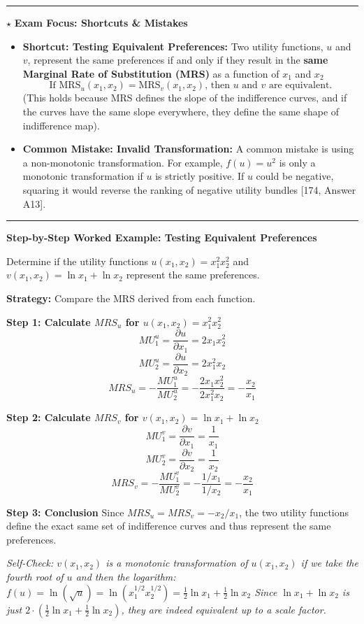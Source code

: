 \documentclass{article}
\begin{document}
\noindent\rule{\linewidth}{0.4pt}

\noindent $\star$ \textbf{Exam Focus: Shortcuts \& Mistakes}

\begin{itemize}
    \item \textbf{Shortcut: Testing Equivalent Preferences:} Two utility functions, $u$ and $v$, represent the same preferences if and only if they result in the \textbf{same Marginal Rate of Substitution (MRS)} as a function of $x_1$ and $x_2$ \[\text{If } \text{MRS}_u(x_1, x_2) = \text{MRS}_v(x_1, x_2) \text{, then } u \text{ and } v \text{ are equivalent.}\] (This holds because MRS defines the slope of the indifference curves, and if the curves have the same slope everywhere, they define the same shape of indifference map).
    \item \textbf{Common Mistake: Invalid Transformation:} A common mistake is using a non-monotonic transformation. For example, $f(u)=u^2$ is only a monotonic transformation if $u$ is strictly positive. If $u$ could be negative, squaring it would reverse the ranking of negative utility bundles [174, Answer A13].
\end{itemize}

\noindent\rule{\linewidth}{0.4pt}

\noindent\textbf{Step-by-Step Worked Example: Testing Equivalent Preferences}

Determine if the utility functions $u(x_1, x_2) = x_1^2 x_2^2$ and $v(x_1, x_2) = \ln x_1 + \ln x_2$ represent the same preferences.

\textbf{Strategy:} Compare the MRS derived from each function.

\textbf{Step 1: Calculate $MRS_u$ for $u(x_1, x_2) = x_1^2 x_2^2$} \[MU_1^u = \frac{\partial u}{\partial x_1} = 2x_1 x_2^2\] \[MU_2^u = \frac{\partial u}{\partial x_2} = 2x_1^2 x_2\] \[MRS_u = -\frac{MU_1^u}{MU_2^u} = -\frac{2x_1 x_2^2}{2x_1^2 x_2} = -\frac{x_2}{x_1}\]

\textbf{Step 2: Calculate $MRS_v$ for $v(x_1, x_2) = \ln x_1 + \ln x_2$} \[MU_1^v = \frac{\partial v}{\partial x_1} = \frac{1}{x_1}\] \[MU_2^v = \frac{\partial v}{\partial x_2} = \frac{1}{x_2}\] \[MRS_v = -\frac{MU_1^v}{MU_2^v} = -\frac{1/x_1}{1/x_2} = -\frac{x_2}{x_1}\]

\textbf{Step 3: Conclusion}
Since $MRS_u = MRS_v = -x_2/x_1$, the two utility functions define the exact same set of indifference curves and thus represent the same preferences.

\textit{Self-Check: $v(x_1, x_2)$ is a monotonic transformation of $u(x_1, x_2)$ if we take the fourth root of $u$ and then the logarithm: $f(u) = \ln(\sqrt{u}) = \ln(x_1^{1/2} x_2^{1/2}) = \frac{1}{2}\ln x_1 + \frac{1}{2}\ln x_2$ Since $\ln x_1 + \ln x_2$ is just $2 \cdot (\frac{1}{2}\ln x_1 + \frac{1}{2}\ln x_2)$, they are indeed equivalent up to a scale factor.}
\end{document}
